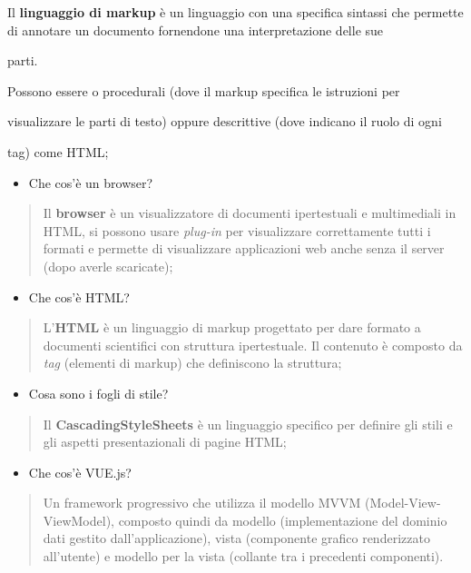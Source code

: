 Il \textbf{linguaggio di markup} è un linguaggio con una specifica
sintassi che permette di annotare un documento fornendone una
interpretazione delle sue

parti.

Possono essere o procedurali (dove il markup specifica le istruzioni per

visualizzare le parti di testo) oppure descrittive (dove indicano il
ruolo di ogni

tag) come HTML;

\begin{itemize}
\item
  Che cos'è un browser?
\end{itemize}

\begin{quote}
Il \textbf{browser} è un visualizzatore di documenti ipertestuali e
multimediali in HTML, si possono usare \emph{plug-in} per visualizzare
correttamente tutti i formati e permette di visualizzare applicazioni
web anche senza il server (dopo averle scaricate);
\end{quote}

\begin{itemize}
\item
  Che cos'è HTML?
\end{itemize}

\begin{quote}
L'\textbf{HTML} è un linguaggio di markup progettato per dare formato a
documenti scientifici con struttura ipertestuale. Il contenuto è
composto da \emph{tag} (elementi di markup) che definiscono la
struttura;
\end{quote}

\begin{itemize}
\item
  Cosa sono i fogli di stile?
\end{itemize}

\begin{quote}
Il \textbf{CascadingStyleSheets} è un linguaggio specifico per definire
gli stili e gli aspetti presentazionali di pagine HTML;
\end{quote}

\begin{itemize}
\item
  Che cos'è VUE.js?
\end{itemize}

\begin{quote}
Un framework progressivo che utilizza il modello MVVM
(Model-View-ViewModel), composto quindi da modello (implementazione del
dominio dati gestito dall'applicazione), vista (componente grafico
renderizzato all'utente) e modello per la vista (collante tra i
precedenti componenti).
\end{quote}

